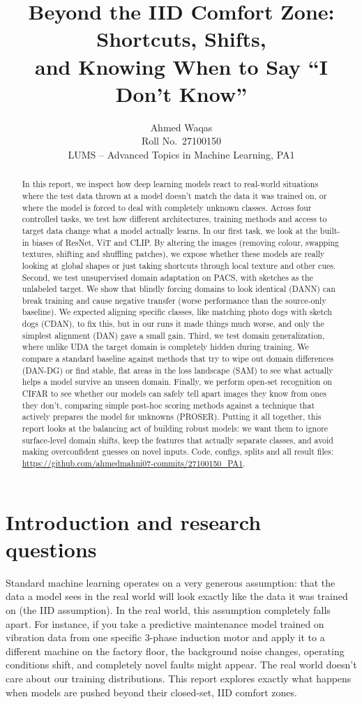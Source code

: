 \documentclass{article}
\title{Beyond the IID Comfort Zone: Shortcuts, Shifts,\\ and Knowing When to Say ``I Don't Know''}
\author{Ahmed Waqas \\ Roll No.\ 27100150 \\ LUMS -- Advanced Topics in Machine Learning, PA1}
\begin{document}
\maketitle

\begin{abstract}
In this report, we inspect how deep learning models react to real-world situations where the test data thrown at a model doesn't match the data it was trained on, or where the model is forced to deal with completely unknown classes. Across four controlled tasks, we test how different architectures, training methods and access to target data change what a model actually learns. In our first task, we look at the built-in biases of ResNet, ViT and CLIP. By altering the images (removing colour, swapping textures, shifting and shuffling patches), we expose whether these models are really looking at global shapes or just taking shortcuts through local texture and other cues. Second, we test unsupervised domain adaptation on PACS, with sketches as the unlabeled target. We show that blindly forcing domains to look identical (DANN) can break training and cause negative transfer (worse performance than the source-only baseline). We expected aligning specific classes, like matching photo dogs with sketch dogs (CDAN), to fix this, but in our runs it made things much worse, and only the simplest alignment (DAN) gave a small gain. Third, we test domain generalization, where unlike UDA the target domain is completely hidden during training. We compare a standard baseline against methods that try to wipe out domain differences (DAN-DG) or find stable, flat areas in the loss landscape (SAM) to see what actually helps a model survive an unseen domain. Finally, we perform open-set recognition on CIFAR to see whether our models can safely tell apart images they know from ones they don't, comparing simple post-hoc scoring methods against a technique that actively prepares the model for unknowns (PROSER).
Putting it all together, this report looks at the balancing act of building robust models: we want them to ignore surface-level domain shifts, keep the features that actually separate classes, and avoid making overconfident guesses on novel inputs. Code, configs, splits and all result files: \url{https://github.com/ahmedmahni07-commits/27100150_PA1}.
\end{abstract}

\section{Introduction and research questions}
Standard machine learning operates on a very generous assumption: that the data a model sees in the real world will look exactly like the data it was trained on (the IID assumption). In the real world, this assumption completely falls apart. For instance, if you take a predictive maintenance model trained on vibration data from one specific 3-phase induction motor and apply it to a different machine on the factory floor, the background noise changes, operating conditions shift, and completely novel faults might appear. The real world doesn't care about our training distributions. This report explores exactly what happens when models are pushed beyond their closed-set, IID comfort zones.
\end{document}
